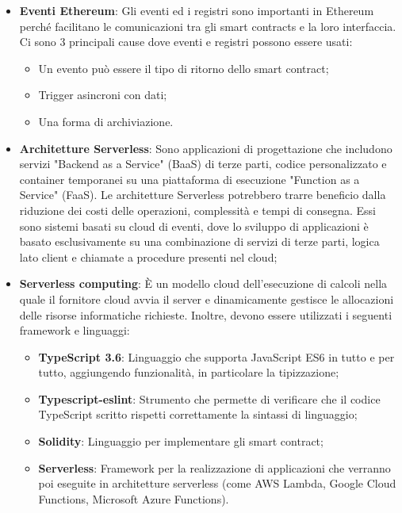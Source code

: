 \begin{itemize}
\item \textbf{Eventi Ethereum}: Gli eventi ed i registri sono importanti in Ethereum perch\'e facilitano le comunicazioni tra gli smart contracts e la loro interfaccia.
Ci sono 3 principali cause dove eventi e registri possono essere usati:
\begin{itemize}
\item Un evento pu\`o essere il tipo di ritorno dello smart contract;
\item Trigger asincroni con dati;
\item Una forma di archiviazione.
\end{itemize}

\item \textbf{Architetture Serverless}: Sono applicazioni di progettazione che includono servizi "Backend as a Service" (BaaS) di terze parti, codice personalizzato e container temporanei su una piattaforma di esecuzione "Function as a Service" (FaaS). Le architetture Serverless potrebbero trarre beneficio dalla riduzione dei costi delle operazioni, complessit\`a e tempi di consegna. Essi sono sistemi basati su cloud di eventi, dove lo sviluppo di applicazioni è basato esclusivamente su una combinazione di servizi di terze parti, logica lato client e chiamate a procedure presenti nel cloud;
\item \textbf{Serverless computing}: È un modello cloud dell'esecuzione di calcoli nella quale il fornitore cloud avvia il server e dinamicamente gestisce le allocazioni delle risorse informatiche richieste.
Inoltre, devono essere utilizzati i seguenti framework e linguaggi:
\begin{itemize}
\item \textbf{TypeScript 3.6}: Linguaggio che supporta JavaScript ES6 in tutto e per tutto, aggiungendo funzionalità, in particolare la tipizzazione;
\item \textbf{Typescript-eslint}: Strumento che permette di verificare che il codice TypeScript scritto rispetti correttamente la sintassi di linguaggio;
\item \textbf{Solidity}: Linguaggio per implementare gli smart contract;
\item \textbf{Serverless}: Framework per la realizzazione di applicazioni che verranno poi eseguite in architetture serverless (come AWS Lambda, Google Cloud Functions, Microsoft Azure Functions).
\end{itemize}

\end{itemize}

